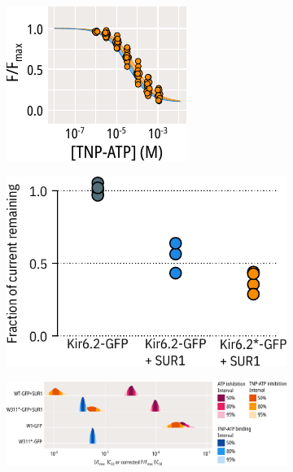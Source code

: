 \begin{figure}[h]
\begin{subfigure}[t]{0.45\textwidth}
	\end{subfigure}
	\vfill
	\begin{subfigure}[t]{0.45\textwidth}
		\caption{}\label{ch6fig:nosur_unroofed}
		\centering
		\includegraphics[width=\textwidth]{nosur_unroofed.pdf}
	\end{subfigure}
	\hfill
	\begin{subfigure}[t]{0.45\textwidth}
		\caption{}\label{ch6fig:tolb_inhibition_1}
		\centering
		\includegraphics[width=\textwidth]{tolb_inhibition_1.pdf}
	\end{subfigure}
	\vfill
	\begin{subfigure}[t]{0.9\textwidth}
		\caption{}\label{ch6fig:nosur_ec50s}
		\centering
		\includegraphics[width=\textwidth]{nosur_ec50s.pdf}
	\end{subfigure}
	\caption[SUR1 alters inhibition but not binding at Kir6.2]{
	}\label{ch6fig:no_sur}
\end{figure}

